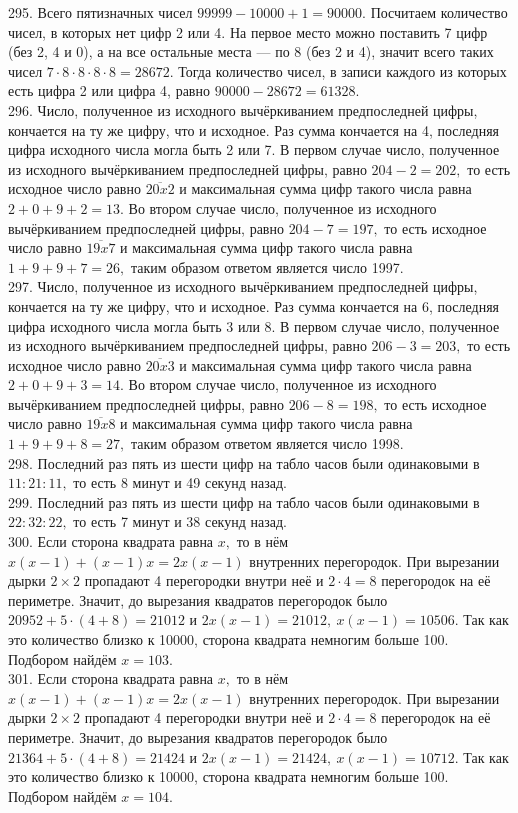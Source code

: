 295. Всего пятизначных чисел $99999-10000+1=90000.$ Посчитаем количество чисел, в которых нет цифр 2 или 4. На первое место можно поставить 7 цифр (без 2, 4 и 0), а на все остальные места --- по 8 (без 2 и 4), значит всего таких чисел $7\cdot8\cdot8\cdot8\cdot8=28672.$ Тогда количество чисел, в записи каждого из которых есть цифра 2 или цифра 4, равно $90000-28672=61328.$\\
296. Число, полученное из исходного вычёркиванием предпоследней цифры, кончается на ту же цифру, что и исходное. Раз сумма кончается на 4, последняя цифра исходного числа могла быть 2 или 7. В первом случае число, полученное из исходного вычёркиванием предпоследней цифры, равно $204-2=202,$ то есть исходное число равно $\overline{20x2}$ и максимальная сумма цифр такого числа равна $2+0+9+2=13.$ Во втором случае число, полученное из исходного вычёркиванием предпоследней цифры, равно $204-7=197,$ то есть исходное число равно $\overline{19x7}$ и максимальная сумма цифр такого числа равна $1+9+9+7=26,$ таким образом ответом является число 1997.\\
297. Число, полученное из исходного вычёркиванием предпоследней цифры, кончается на ту же цифру, что и исходное. Раз сумма кончается на 6, последняя цифра исходного числа могла быть 3 или 8. В первом случае число, полученное из исходного вычёркиванием предпоследней цифры, равно $206-3=203,$ то есть исходное число равно $\overline{20x3}$ и максимальная сумма цифр такого числа равна $2+0+9+3=14.$ Во втором случае число, полученное из исходного вычёркиванием предпоследней цифры, равно $206-8=198,$ то есть исходное число равно $\overline{19x8}$ и максимальная сумма цифр такого числа равна $1+9+9+8=27,$ таким образом ответом является число 1998.\\
298. Последний раз пять из шести цифр на табло часов были одинаковыми в $11:21:11,$ то есть 8 минут и 49 секунд назад.\\
299. Последний раз пять из шести цифр на табло часов были одинаковыми в $22:32:22,$ то есть 7 минут и 38 секунд назад.\\
300. Если сторона квадрата равна $x,$ то в нём $x(x-1)+(x-1)x=2x(x-1)$ внутренних перегородок. При вырезании дырки $2\times2$ пропадают 4 перегородки внутри неё и $2\cdot4=8$ перегородок на её периметре. Значит, до вырезания квадратов перегородок было $20952+5\cdot(4+8)=21012$ и $2x(x-1)=21012,\ x(x-1)=10506.$ Так как это количество близко к 10000, сторона квадрата немногим больше 100. Подбором найдём $x=103.$\\
301. Если сторона квадрата равна $x,$ то в нём $x(x-1)+(x-1)x=2x(x-1)$ внутренних перегородок. При вырезании дырки $2\times2$ пропадают 4 перегородки внутри неё и $2\cdot4=8$ перегородок на её периметре. Значит, до вырезания квадратов перегородок было $21364+5\cdot(4+8)=21424$ и $2x(x-1)=21424,\ x(x-1)=10712.$ Так как это количество близко к 10000, сторона квадрата немногим больше 100. Подбором найдём $x=104.$\\
